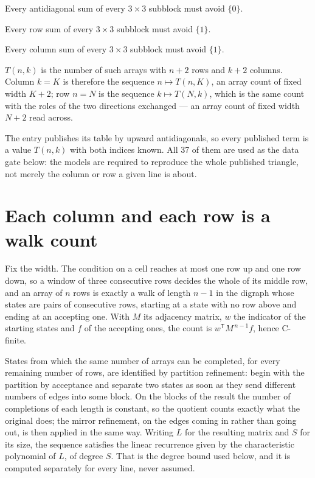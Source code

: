 \documentclass[11pt]{article}
\theoremstyle{definition}
\begin{document}
Every antidiagonal sum of every $3\times3$ subblock must avoid $\{0\}$.

Every row sum of every $3\times3$ subblock must avoid $\{1\}$.

Every column sum of every $3\times3$ subblock must avoid $\{1\}$.

$T(n,k)$ is the number of such arrays with $n + 2$ rows and $k + 2$ columns. Column $k = K$ is therefore the sequence $n \mapsto T(n,K)$, an array count of fixed width $K + 2$; row $n = N$ is the sequence $k \mapsto T(N,k)$, which is the same count with the roles of the two directions exchanged --- an array count of fixed width $N + 2$ read across.

The entry publishes its table by upward antidiagonals, so every published term is a value $T(n,k)$ with both indices known. All 37 of them are used as the data gate below: the models are required to reproduce the whole published triangle, not merely the column or row a given line is about.

\section{Each column and each row is a walk count}

Fix the width. The condition on a cell reaches at most one row up and one row down, so a window of three consecutive rows decides the whole of its middle row, and an array of $n$ rows is exactly a walk of length $n-1$ in the digraph whose states are pairs of consecutive rows, starting at a state with no row above and ending at an accepting one. With $M$ its adjacency matrix, $w$ the indicator of the starting states and $f$ of the accepting ones, the count is $w^{\mathsf T}M^{\,n-1}f$, hence C-finite.

States from which the same number of arrays can be completed, for every remaining number of rows, are identified by partition refinement: begin with the partition by acceptance and separate two states as soon as they send different numbers of edges into some block. On the blocks of the result the number of completions of each length is constant, so the quotient counts exactly what the original does; the mirror refinement, on the edges coming in rather than going out, is then applied in the same way. Writing $L$ for the resulting matrix and $S$ for its size, the sequence satisfies the linear recurrence given by the characteristic polynomial of $L$, of degree $S$. That is the degree bound used below, and it is computed separately for every line, never assumed.
\end{document}
